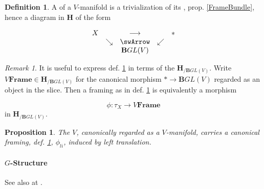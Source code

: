 \documentclass[12pt,titlepage]{article}
\newcommand{\itexarray}[1]{\begin{matrix}#1\end{matrix}}
\theoremstyle{plain}
\newtheorem{prop}{Proposition}
\theoremstyle{definition}
\newtheorem{defn}{Definition}
\theoremstyle{remark}
\newtheorem{remark}{Remark}
\begin{document}
\begin{defn}
\label{Framing}\hypertarget{Framing}{}
A  of a $V$-manifold is a trivialization of its , prop. \ref{FrameBundle}, hence a diagram in $\mathbf{H}$ of the form

\begin{displaymath}
\itexarray{
    X && \longrightarrow && \ast
    \\
    & \searrow &\swArrow& \swarrow
    \\
    && \mathbf{B}GL(V)
  }
\end{displaymath}
\end{defn}
\begin{remark}
\label{ModuliForFramings}\hypertarget{ModuliForFramings}{}
It is useful to express def. \ref{Framing} in terms of the  $\mathbf{H}_{/\mathbf{B}GL(V)}$. Write $V\mathbf{Frame}\in \mathbf{H}_{/\mathbf{B}GL(V)}$ for the canonical morphism $\ast \to \mathbf{B}GL(V)$ regarded as an object in the slice. Then a framing as in def. \ref{Framing} is equivalently a morphism

\begin{displaymath}
\phi \colon \tau_X \longrightarrow V\mathbf{Frame}
\end{displaymath}
in $\mathbf{H}_{/\mathbf{B}GL(V)}$.

\end{remark}
\begin{prop}
\label{LeftTranslationFraming}\hypertarget{LeftTranslationFraming}{}
The  $V$, canonically regarded as a $V$-manifold, carries a canonical framing, def. \ref{Framing}, $\phi_{li}$, induced by left translation.

\end{prop}
\hypertarget{GStructure}{}\paragraph*{{$G$-Structure}}\label{GStructure}

See also at .
\end{document}
